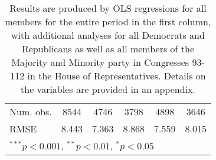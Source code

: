 \documentclass[12pt]{article}
\newcommand\fnote[1]{\captionsetup{font=small}\caption*{#1}}
\begin{document}
\begin{table}[H]
\begin{center}
\begin{tabular}{l c c c c c }
			Num. obs.              & 8544           & 4746           & 3798           & 4898           & 3646           \\
			RMSE                   & 8.443          & 7.363          & 8.868          & 7.559          & 8.015          \\
			\hline
			\multicolumn{6}{l}{\scriptsize{$^{***}p<0.001$, $^{**}p<0.01$, $^*p<0.05$}}
		\end{tabular}
		\fnote{Results are produced by OLS regressions for all members for the entire period in the first column, with additional analyses for all Democrats and Republicans as well as all members of the Majority and Minority party in Congresses 93-112 in the House of Representatives. Details on the variables are provided in an appendix.}
	\end{center}
\end{table}
\end{document}
